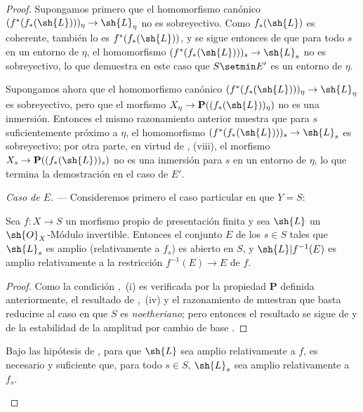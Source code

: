 \begin{proof}
Supongamos primero que el homomorfismo canónico $(f^*(f_*(\sh{L})))_\eta\to\sh{L}_\eta$ no es sobreyectivo.
Como $f_*(\sh{L})$ es coherente, también lo es $f^*(f_*(\sh{L}))$, y se sigue entonces de  que para todo $s$ en un entorno de $\eta$, el homomorfismo $(f^*(f_*(\sh{L})))_s\to\sh{L}_s$ no es sobreyectivo, lo que demuestra en este caso que $S\setmin E'$ es un entorno de $\eta$.

Supongamos ahora que el homomorfismo canónico $(f^*(f_*(\sh{L})))_\eta\to\sh{L}_\eta$ es sobreyectivo, pero que el morfismo $X_\eta\to\mathbf{P}((f_*(\sh{L}))_\eta)$ no es una inmersión.
Entonces el mismo razonamiento anterior muestra que para $s$ suficientemente próximo a $\eta$, el homomorfismo $(f^*(f_*(\sh{L})))_s\to\sh{L}_s$ es sobreyectivo; por otra parte, en virtud de , (viii), el morfismo $X_s\to\mathbf{P}((f_*(\sh{L}))_s)$ no es una inmersión para $s$ en un entorno de $\eta$, lo que termina la demostración en el caso de $E'$.

\emph{Caso de $E$.} --- Consideremos primero el caso particular en que $Y=S$:

\begin{corollary}[9.6.4]
\label{IV.9.6.4}
Sea $f:X\to S$ un morfismo \textup{propio} de presentación finita y sea $\sh{L}$ un $\sh{O}_X$-Módulo invertible.
Entonces el conjunto $E$ de los $s\in S$ tales que $\sh{L}_s$ es amplio (relativamente a $f_s$) es abierto en $S$, y $\sh{L}|f^{-1}(E)$ es amplio relativamente a la restricción $f^{-1}(E)\to E$ de $f$.
\end{corollary}

\begin{proof}
Como la condición ,~(i) es verificada por la propiedad $\boldsymbol{P}$ definida anteriormente, el resultado de ,~(iv) y el razonamiento de  muestran que basta reducirse al caso en que $S$ es \emph{noetheriano}; pero entonces el resultado se sigue de  y de la estabilidad de la amplitud por cambio de base .
\end{proof}

\begin{corollary}[9.6.5]
\label{IV.9.6.5}
Bajo las hipótesis de , para que $\sh{L}$ sea amplio relativamente a $f$, es necesario y suficiente que, para todo $s\in S$, $\sh{L}_s$ sea amplio relativamente a $f_s$.
\end{corollary}


\end{proof}
